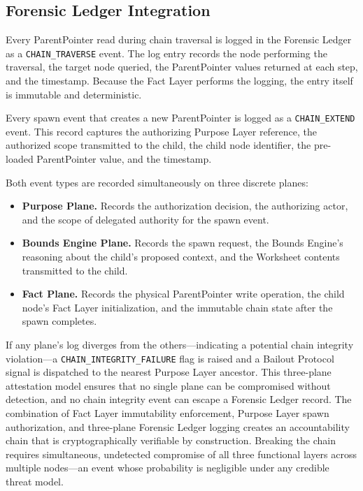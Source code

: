 \subsection{Forensic Ledger Integration}

Every ParentPointer read during chain traversal is logged in the Forensic Ledger as a \texttt{CHAIN\_TRAVERSE} event. The log entry records the node performing the traversal, the target node queried, the ParentPointer values returned at each step, and the timestamp. Because the Fact Layer performs the logging, the entry itself is immutable and deterministic.

Every spawn event that creates a new ParentPointer is logged as a \texttt{CHAIN\_EXTEND} event. This record captures the authorizing Purpose Layer reference, the authorized scope transmitted to the child, the child node identifier, the pre-loaded ParentPointer value, and the timestamp.

Both event types are recorded simultaneously on three discrete planes:

\begin{itemize}[noitemsep]
    \item \textbf{Purpose Plane.} Records the authorization decision, the authorizing actor, and the scope of delegated authority for the spawn event.
    \item \textbf{Bounds Engine Plane.} Records the spawn request, the Bounds Engine's reasoning about the child's proposed context, and the Worksheet contents transmitted to the child.
    \item \textbf{Fact Plane.} Records the physical ParentPointer write operation, the child node's Fact Layer initialization, and the immutable chain state after the spawn completes.
\end{itemize}

If any plane's log diverges from the others—indicating a potential chain integrity violation—a \texttt{CHAIN\_INTEGRITY\_FAILURE} flag is raised and a Bailout Protocol signal is dispatched to the nearest Purpose Layer ancestor. This three-plane attestation model ensures that no single plane can be compromised without detection, and no chain integrity event can escape a Forensic Ledger record. The combination of Fact Layer immutability enforcement, Purpose Layer spawn authorization, and three-plane Forensic Ledger logging creates an accountability chain that is cryptographically verifiable by construction. Breaking the chain requires simultaneous, undetected compromise of all three functional layers across multiple nodes—an event whose probability is negligible under any credible threat model.
